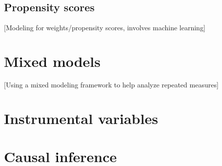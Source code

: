 \documentclass[
]{book}
\begin{document}
\hypertarget{propensity-scores}{%
\section{Propensity scores}\label{propensity-scores}}

{[}Modeling for weights/propensity scores, involves machine learning{]}

\hypertarget{mixed-models}{%
\chapter{Mixed models}\label{mixed-models}}

{[}Using a mixed modeling framework to help analyze repeated measures{]}

\hypertarget{instrumental-variables}{%
\chapter{Instrumental variables}\label{instrumental-variables}}

\hypertarget{causal-inference}{%
\chapter{Causal inference}\label{causal-inference}}

  
\end{document}
